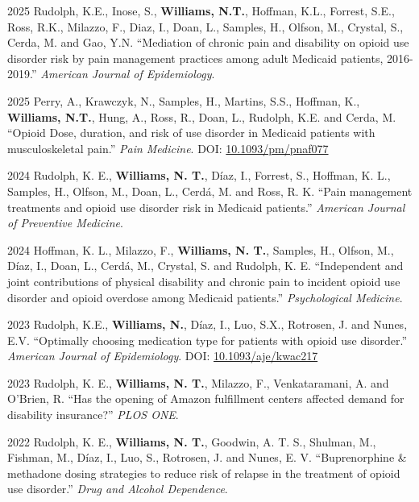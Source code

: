 \documentclass[12pt,letterpaper]{report}
\begin{document}
    \begin{tablist}
    
    \item[2025] \tab Rudolph, K.E., Inose, S., \textbf{Williams, N.T.}, Hoffman, K.L., Forrest, S.E., Ross, R.K., Milazzo, F., Diaz, I., Doan, L., Samples, H., Olfson, M., Crystal, S., Cerda, M. and Gao, Y.N. \enquote{Mediation of chronic pain and disability on opioid use disorder risk by pain management practices among adult Medicaid patients, 2016-2019.} \textit{American Journal of Epidemiology}.
    
    \item[2025] \tab Perry, A., Krawczyk, N., Samples, H., Martins, S.S., Hoffman, K., \textbf{Williams, N.T.}, Hung, A., Ross, R., Doan, L., Rudolph, K.E. and Cerda, M. \enquote{Opioid Dose, duration, and risk of use disorder in Medicaid patients with musculoskeletal pain.} \textit{Pain Medicine}. DOI: \href{https://doi.org/10.1093/pm/pnaf077}{10.1093/pm/pnaf077} 
    
    \item[2024] \tab Rudolph, K. E., \textbf{Williams, N. T.}, Díaz, I., Forrest, S., Hoffman, K. L., Samples, H., Olfson, M., Doan, L., Cerdá, M. and Ross, R. K. \enquote{Pain management treatments and opioid use disorder risk in Medicaid patients.} \textit{American Journal of Preventive Medicine}.
    
    \item[2024] \tab Hoffman, K. L., Milazzo, F., \textbf{Williams, N. T.}, Samples, H., Olfson, M., Díaz, I., Doan, L., Cerdá, M., Crystal, S. and Rudolph, K. E. \enquote{Independent and joint contributions of physical disability and chronic pain to incident opioid use disorder and opioid overdose among Medicaid patients.} \textit{Psychological Medicine}.
    
        \item[2023] \tab Rudolph, K.E., \textbf{Williams, N.}, Díaz, I., Luo, S.X., Rotrosen, J. and Nunes, E.V. \enquote{Optimally choosing medication type for patients with opioid use disorder.} \textit{American Journal of Epidemiology}. DOI: \href{https://doi.org/10.1093/aje/kwac217}{10.1093/aje/kwac217}
        
        \item[2023] \tab Rudolph, K. E., \textbf{Williams, N. T.}, Milazzo, F., Venkataramani, A. and O’Brien, R. \enquote{Has the opening of Amazon fulfillment centers affected demand for disability insurance?} \textit{PLOS ONE}.
        
        \item[2022] \tab Rudolph, K. E., \textbf{Williams, N. T.}, Goodwin, A. T. S., Shulman, M., Fishman, M., Díaz, I., Luo, S., Rotrosen, J. and Nunes, E. V. \enquote{Buprenorphine \& methadone dosing strategies to reduce risk of relapse in the treatment of opioid use disorder.} \textit{Drug and Alcohol Dependence}.
        

\end{tablist}
\end{document}
